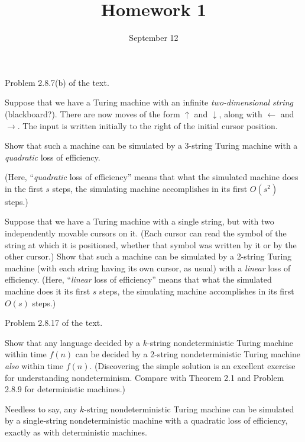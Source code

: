 \documentclass{../math167}
\title{Homework 1}
\author{}
\date{September 12}
\begin{document}
\begin{problems}
\item Problem 2.8.7(b) of the text.
  \begin{book}
    Suppose that we have a Turing machine with an infinite
    \emph{two-dimensional string} (blackboard?). There are now moves
    of the form \(\uparrow\) and \(\downarrow\), along with
    \(\leftarrow\) and \(\rightarrow\).  The input is written
    initially to the right of the initial cursor position.
    \begin{problems}[start=2]
    \item Show that such a machine can be simulated by a 3-string
      Turing machine with a \emph{quadratic} loss of efficiency.
    \end{problems}
  \end{book}
  (Here, ``\emph{quadratic} loss of efficiency'' means that what the
  simulated machine does in the first \(s\) steps, the simulating
  machine accomplishes in its first \(O(s^2)\) steps.)

  \begin{solution}
  \end{solution}

\item Suppose that we have a Turing machine with a single string, but
  with two independently movable cursors on it.  (Each cursor can read
  the symbol of the string at which it is positioned, whether that
  symbol was written by it or by the other cursor.)  Show that such a
  machine can be simulated by a 2-string Turing machine (with each
  string having its own cursor, as usual) with a \emph{linear} loss of
  efficiency.  (Here, ``\emph{linear} loss of efficiency'' means that
  what the simulated machine does it its first \(s\) steps, the
  simulating machine accomplishes in its first \(O(s)\) steps.)

  \begin{solution}
  \end{solution}

\item Problem 2.8.17 of the text.
  \begin{book}
    Show that any language decided by a \(k\)-string nondeterministic
    Turing machine within time \(f(n)\) can be decided by a 2-string
    nondeterministic Turing machine \emph{also} within time \(f(n)\).
    (Discovering the simple solution is an excellent exercise for
    understanding nondeterminism.  Compare with Theorem 2.1 and
    Problem 2.8.9 for deterministic machines.)

    Needless to say, any \(k\)-string nondeterministic Turing machine
    can be simulated by a single-string nondeterministic machine with
    a quadratic loss of efficiency, exactly as with deterministic
    machines.
  \end{book}

  \begin{solution}
  \end{solution}
\end{problems}
\end{document}
